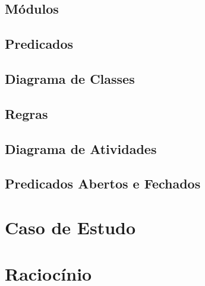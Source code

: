 \documentclass[openright]{normas-utf-tex} %
\begin{document}
	

		\subsection{Módulos} 
			\label{mods}			
			
		
		\subsection{Predicados} 
			\label{predic}
			
			
		\subsection{Diagrama de Classes}
			


		\subsection{Regras}
			\label{regras}
			

		\subsection{Diagrama de Atividades} \label{umldiagram}
		
			

		\subsection{Predicados Abertos e Fechados} \label{cenarios}
		
			


	\section{Caso de Estudo} \label{studycase}


			

	\section{Raciocínio} \label{rac}


			
	
\end{document}
